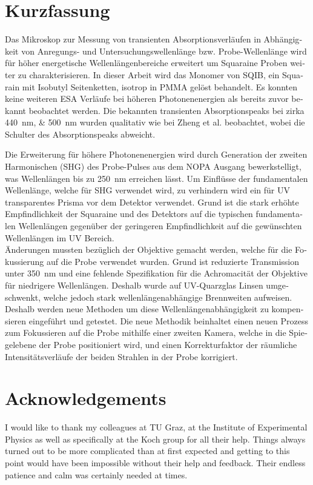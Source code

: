 \documentclass[twoside,openright,listof=numbered]{scrreprt}
\begin{document}
\chapter*{Kurzfassung}
\begin{otherlanguage}{german}
Das Mikroskop zur Messung von transienten Absorptionsverläufen in Abhängigkeit von Anregungs- und Untersuchungswellenlänge bzw. Probe-Wellenlänge wird für höher energetische Wellenlängenbereiche erweitert um Squaraine Proben weiter zu charakterisieren. In dieser Arbeit wird das Monomer von SQIB, ein Squarain mit Isobutyl Seitenketten, isotrop in PMMA gelöst behandelt. Es konnten keine weiteren ESA Verläufe bei höheren Photonenenergien als bereits zuvor bekannt beobachtet werden. Die bekannten transienten Absorptionspeaks bei zirka \SIlist{440;500}{\nano\meter} wurden qualitativ wie bei Zheng et al.\cite{Zheng2020} beobachtet, wobei die Schulter des Absorptionspeaks abweicht.

Die Erweiterung für höhere Photonenenergien wird durch Generation der zweiten Harmonischen (SHG) des Probe-Pulses aus dem NOPA Ausgang bewerkstelligt, was Wellenlängen bis zu \qty{250}{\nano\meter} erreichen lässt. Um Einflüsse der fundamentalen Wellenlänge, welche für SHG verwendet wird, zu verhindern wird ein für UV transparentes Prisma vor dem Detektor verwendet. Grund ist die stark erhöhte Empfindlichkeit der Squaraine und des Detektors auf die typischen fundamentalen Wellenlängen gegenüber der geringeren Empfindlichkeit auf die gewünschten Wellenlängen im UV Bereich.\\
Änderungen mussten bezüglich der Objektive gemacht werden, welche für die Fokussierung auf die Probe verwendet wurden. Grund ist reduzierte Transmission unter \qty{350}{\nano\meter} und eine fehlende Spezifikation für die Achromacität der Objektive für niedrigere Wellenlängen. Deshalb wurde auf UV-Quarzglas Linsen umgeschwenkt, welche jedoch stark wellenlängenabhängige Brennweiten aufweisen. Deshalb werden neue Methoden um diese Wellenlängenabhängigkeit zu kompensieren eingeführt und getestet. Die neue Methodik beinhaltet einen neuen Prozess zum Fokussieren auf die Probe mithilfe einer zweiten Kamera, welche in die Spiegelebene der Probe positioniert wird, und einen Korrekturfaktor der räumliche Intensitätsverläufe der beiden Strahlen in der Probe korrigiert.
\end{otherlanguage}
\chapter*{Acknowledgements}
I would like to thank my colleagues at TU Graz, at the Institute of Experimental Physics as well as specifically at the Koch group for all their help. Things always turned out to be more complicated than at first expected and getting to this point would have been impossible without their help and feedback. Their endless patience and calm was certainly needed at times. 
\end{document}

